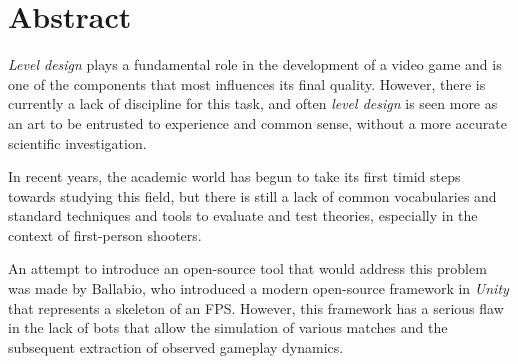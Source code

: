 \documentclass{Configuration_Files/PoliMi3i_thesis}
\begin{document}


\pagestyle{empty} %
\frontmatter %


\startpreamble
\setcounter{page}{1} %

\chapter*{Abstract} 
\textit{Level design} plays a fundamental role in the development of a video game and is one of the components that most influences its final quality. However, there is currently a lack of discipline for this task, and often \textit{level design} is seen more as an art to be entrusted to experience and common sense, without a more accurate scientific investigation.

In recent years, the academic world has begun to take its first timid steps towards studying this field, but there is still a lack of common vocabularies and standard techniques and tools to evaluate and test theories, especially in the context of first-person shooters.

An attempt to introduce an open-source tool that would address this problem was made by Ballabio, who introduced a modern open-source framework in \textit{Unity} that represents a skeleton of an FPS. However, this framework has a serious flaw in the lack of bots that allow the simulation of various matches and the subsequent extraction of observed gameplay dynamics.
\end{document}
